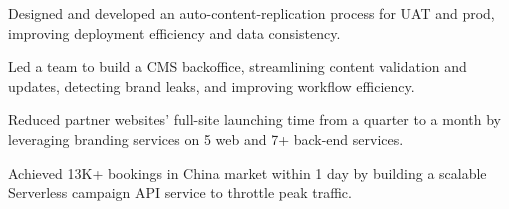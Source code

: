 \begin{cventries}
{\begin{cvitems}
      \item {Designed and developed an auto-content-replication process for UAT and prod, improving deployment efficiency and data consistency.}
      \item {Led a team to build a CMS backoffice, streamlining content validation and updates, detecting brand leaks, and improving workflow efficiency.}
      \item {Reduced partner websites' full-site launching time from a quarter to a month by leveraging branding services on 5 web and 7+ back-end services.}
      \item {Achieved 13K+ bookings in China market within 1 day by building a scalable Serverless campaign API service to throttle peak traffic.}
    \end{cvitems}
  }


\end{cventries}
